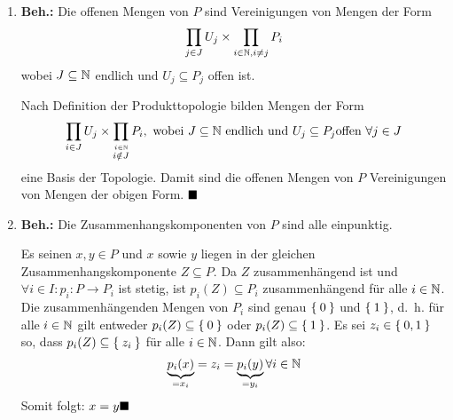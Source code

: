 \begin{solution}[\ref{ub2:aufg4}]
    \begin{enumerate}[label=(\alph*)]
        \item \textbf{Beh.:} Die offenen Mengen von $P$ sind
              Vereinigungen von Mengen der Form 
              \[\prod_{j \in J} U_j \times \prod_{i \in \mathbb{N}, i \neq j} P_i\]
              wobei $J \subseteq \mathbb{N}$ endlich und $U_j \subseteq P_j$
              offen ist.
              \begin{beweis}
                Nach Definition der Produkttopologie bilden Mengen
                der Form
                \[\prod_{i \in J} U_j \times \prod_{\stackrel{i \in \mathbb{N}}{i \notin J}} P_i, \text{ wobei } J \subseteq \mathbb{N} \text{ endlich und } U_j \subseteq P_j \text{offen } \forall{j \in J}\]
                eine Basis der Topologie. Damit sind die offenen 
                Mengen von $P$ Vereinigungen von Mengen der obigen
                Form. $\qed$
              \end{beweis}
        \item \textbf{Beh.:} Die Zusammenhangskomponenten von $P$
              sind alle einpunktig.
              \begin{beweis}
                Es seinen $x,y \in P$ und $x$ sowie $y$ liegen in der
                gleichen Zusammenhangskomponente $Z \subseteq P$.
                Da $Z$ zusammenhängend ist und $\forall{i \in I}: p_i : P \rightarrow P_i$
                ist stetig, ist $p_i(Z) \subseteq P_i$ zusammenhängend
                für alle $i \in \mathbb{N}$. Die zusammenhängenden Mengen
                von $P_i$ sind genau $\Set{0}$ und $\Set{1}$, d.~h.
                für alle $i \in \mathbb{N}$ gilt entweder $p_i(Z) \subseteq \Set{0}$
                oder $p_i(Z) \subseteq \Set{1}$. Es sei $z_i \in \Set{0,1}$
                so, dass $p_i(Z) \subseteq \Set{z_i}$ für alle $i \in \mathbb{N}$.
                Dann gilt also: 
                \[\underbrace{p_i(x)}_{= x_i} = z_i = \underbrace{p_i(y)}_{= y_i} \forall i \in \mathbb{N}\]
                Somit folgt: $x = y \qed$
                
              \end{beweis}
    \end{enumerate}
\end{solution}
